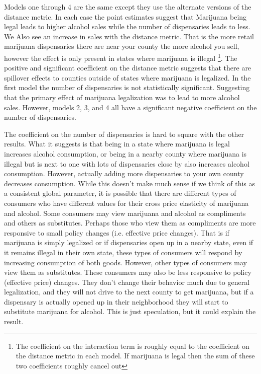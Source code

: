 \documentclass[11pt]{article}
\begin{document}
Models one through 4 are the same except they use the alternate versions of the distance metric. In each case the point estimates suggest that Marijuana being legal leads to higher alcohol sales while the number of dispensaries leads to less. We Also see an increase in sales with the distance metric. That is the more retail marijuana dispensaries there are near your county the more alcohol you sell, however the effect is only present in states where marijuana is illegal \footnote{The coefficient on the interaction term is roughly equal to the coefficient on the distance metric in each model. If marijuana is legal then the sum of these two coefficients roughly cancel out}. The positive and significant coefficient on the distance metric suggests that there are spillover effects to counties outside of states where marijuana is legalized. In the first model the number of dispensaries is not statistically significant. Suggesting that the primary effect of marijuana legalization was to lead to more alcohol sales. However, models 2, 3, and 4 all have a significant negative coefficient on the number of dispensaries. \par 

The coefficient on the number of dispensaries is hard to square with the other results. What it suggests is that being in a state where marijuana is legal increases alcohol consumption, or being in a nearby county where marijuana is illegal but is next to one with lots of dispensaries close by also increases alcohol consumption. However, actually adding more dispensaries to your own county decreases consumption. While this doesn't make much sense if we think of this as a consistent global parameter, it is possible that there are different types of consumers who have different values for their cross price elasticity of marijuana and alcohol. Some consumers may view marijuana and alcohol as compliments and others as substitutes. Perhaps those who view them as compliments are more responsive to small policy changes (i.e. effective price changes). That is if marijuana is simply legalized or if dispensaries open up in a nearby state, even if it remains illegal in their own state, these types of consumers will respond by increasing consumption of both goods. However, other types of consumers may view them as substitutes. These consumers may also be less responsive to policy (effective price) changes. They don't change their behavior much due to general legalization, and they will not drive to the next county to get marijuana, but if a dispensary is actually opened up in their neighborhood they will start to substitute marijuana for alcohol. This is just speculation, but it could explain the result. \par
\end{document}
